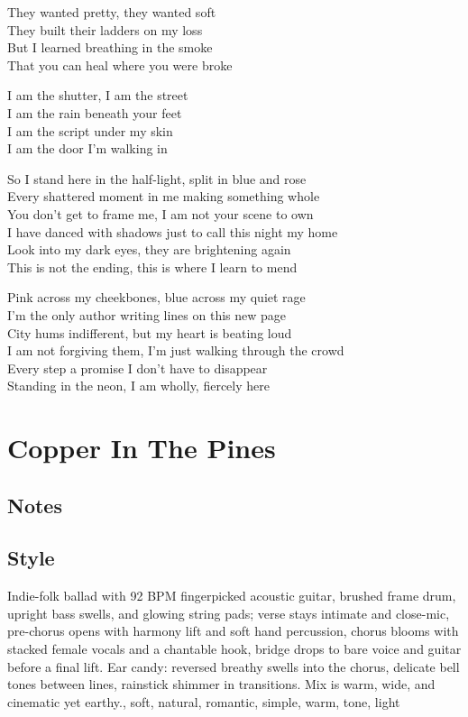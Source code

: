 \begin{lyrics}
They wanted pretty, they wanted soft\\
They built their ladders on my loss\\
But I learned breathing in the smoke\\
That you can heal where you were broke

I am the shutter, I am the street\\
I am the rain beneath your feet\\
I am the script under my skin\\
I am the door I’m walking in

So I stand here in the half-light, split in blue and rose\\
Every shattered moment in me making something whole\\
You don’t get to frame me, I am not your scene to own\\
I have danced with shadows just to call this night my home\\
Look into my dark eyes, they are brightening again\\
This is not the ending, this is where I learn to mend

Pink across my cheekbones, blue across my quiet rage\\
I’m the only author writing lines on this new page\\
City hums indifferent, but my heart is beating loud\\
I am not forgiving them, I’m just walking through the crowd\\
Every step a promise I don’t have to disappear\\
Standing in the neon, I am wholly, fiercely here
\end{lyrics}

\section{Copper In The Pines}
\subsection{Notes}
\subsection{Style}
Indie-folk ballad with 92 BPM fingerpicked acoustic guitar, brushed frame drum, upright bass swells, and glowing string pads; verse stays intimate and close-mic, pre-chorus opens with harmony lift and soft hand percussion, chorus blooms with stacked female vocals and a chantable hook, bridge drops to bare voice and guitar before a final lift. Ear candy: reversed breathy swells into the chorus, delicate bell tones between lines, rainstick shimmer in transitions. Mix is warm, wide, and cinematic yet earthy., soft, natural, romantic, simple, warm, tone, light


